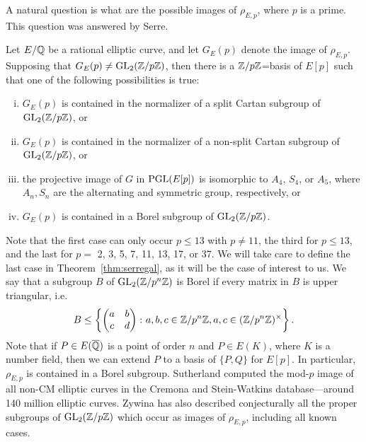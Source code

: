 A natural question is what are the possible images of $\rho_{E,p}$, where $p$ is a prime. This question was answered by Serre.


\begin{thm} \label{thm:serregal}
Let $E/\mathbb{Q}$ be a rational elliptic curve, and let $G_E(p)$ denote the image of $\rho_{E,p}$. Supposing that $G_E(p) \neq \operatorname{GL}_2(\mathbb{Z}/p\mathbb{Z})$, then there is a $\mathbb{Z}/p\mathbb{Z}$=basis of $E[p]$ such that one of the following possibilities is true: \leavevmode\vspace{-1em}
	\begin{enumerate}[(i)] \itemsep-1em
	\item $G_E(p)$ is contained in the normalizer of a split Cartan subgroup of $\operatorname{GL}_2(\mathbb{Z}/p\mathbb{Z})$, or
	\item $G_E(p)$ is contained in the normalizer of a non-split Cartan subgroup of $\operatorname{GL}_2(\mathbb{Z}/p\mathbb{Z})$, or
	\item the projective image of $G$ in $\operatorname{PGL}(E[p])$ is isomorphic to $A_4$, $S_4$, or $A_5$, where $A_n, S_n$ are the alternating and symmetric group, respectively, or
	\item $G_E(p)$ is contained in a Borel subgroup of $\operatorname{GL}_2(\mathbb{Z}/p\mathbb{Z})$. 
	\end{enumerate}
\end{thm}


Note that the first case can only occur $p \leq 13$ with $p \neq 11$, the third for $p \leq 13$, and the last for $p=$ 2, 3, 5, 7, 11, 13, 17, or 37. We will take care to define the last case in Theorem~\ref{thm:serregal}, as it will be the case of interest to us. We say that a subgroup $B$ of $\operatorname{GL}_2(\mathbb{Z}/p^n\mathbb{Z})$ is Borel if every matrix in $B$ is upper triangular, i.e.
	\[
	B \leq \left\{ \begin{pmatrix} a & b \\ c & d \end{pmatrix} \colon a,b,c \in \mathbb{Z}/p^n\mathbb{Z}, a,c \in (\mathbb{Z}/p^n\mathbb{Z})^\times \right\}.
	\]
Note that if $P \in E(\overline{\mathbb{Q}})$ is a point of order $n$ and $P \in E(K)$, where $K$ is a number field, then we can extend $P$ to a basis of $\{ P, Q \}$ for $E[p]$. In particular, $\rho_{E,p}$ is contained in a Borel subgroup. Sutherland computed the mod-$p$ image of all non-CM elliptic curves in the Cremona and Stein-Watkins database---around 140 million elliptic curves. Zywina has also described conjecturally all the proper subgroups of $\operatorname{GL}_2(\mathbb{Z}/p\mathbb{Z})$ which occur as images of $\rho_{E,p}$, including all known cases.


